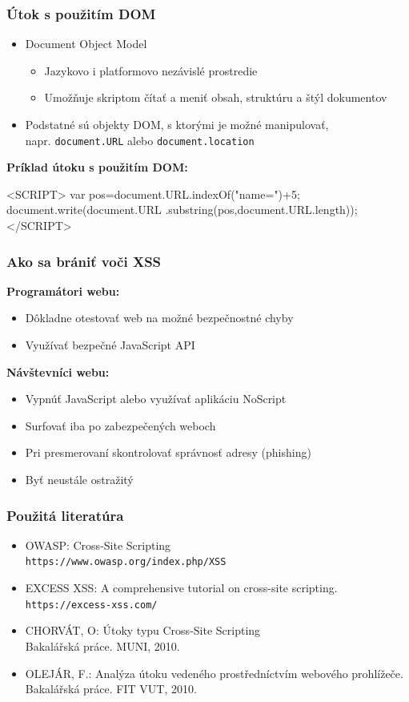 \documentclass[hyperref={unicode}]{beamer}
\begin{document}
\begin{frame}[fragile]
    \frametitle{Útok s použitím DOM}
    \begin{itemize}
        \item Document Object Model
        \begin{itemize}
            \item Jazykovo i platformovo nezávislé prostredie
            \item Umožňuje skriptom čítať a meniť obsah, struktúru a štýl dokumentov
        \end{itemize}
        \item Podstatné sú objekty DOM, s ktorými je možné manipulovať, \\napr. \texttt{document.URL} alebo \texttt{document.location}
    \end{itemize}
\pause
\textbf{Príklad útoku s použitím DOM:}
\begin{semiverbatim}
  <SCRIPT>
    var pos=document.URL.indexOf("name=")+5;
    document.write(document.URL
    .substring(pos,document.URL.length));
  </SCRIPT>
\end{semiverbatim}
\end{frame}

\begin{frame}
    \frametitle{Ako sa brániť voči XSS}
    \textbf{Programátori webu:}
        \begin{itemize}
            \item Dôkladne otestovať web na možné bezpečnostné chyby
            \item Využívať bezpečné JavaScript API
        \end{itemize}
    \textbf{Návštevníci webu:}
        \begin{itemize}
            \item Vypnúť JavaScript alebo využívať aplikáciu NoScript
            \item Surfovať iba po zabezpečených weboch
            \item Pri presmerovaní skontrolovať správnosť adresy (phishing)
            \item Byť neustále ostražitý
        \end{itemize}
\end{frame}

\begin{frame}
    \frametitle{Použitá literatúra}
    \begin{itemize}
        \item OWASP: Cross-Site Scripting \\ \texttt{https://www.owasp.org/index.php/XSS}
        \item EXCESS XSS: A comprehensive tutorial on cross-site scripting. \\ \texttt{https://excess-xss.com/}
        \item CHORVÁT, O: Útoky typu Cross-Site Scripting \\
        Bakalářská práce. MUNI, 2010.
        \item OLEJÁR, F.: Analýza útoku vedeného prostředníctvím webového prohlížeče. Bakalářská práce. FIT VUT, 2010.
    \end{itemize}
\end{frame}
\end{document}

